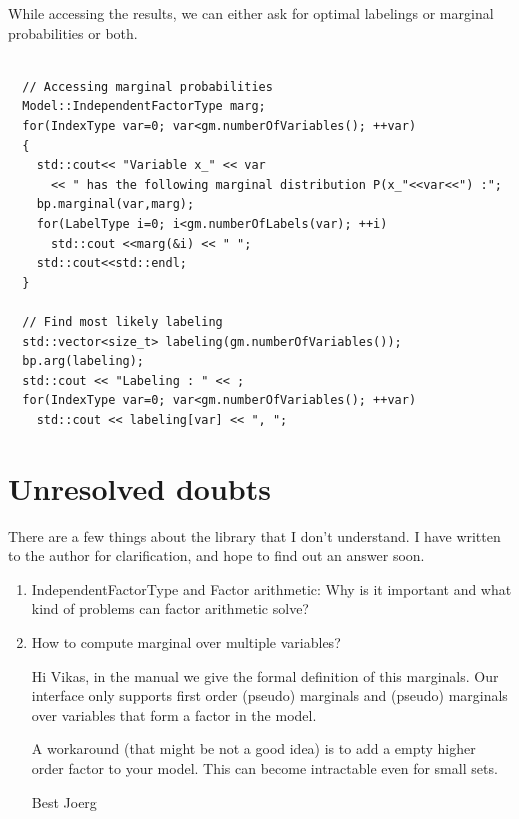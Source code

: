 \documentclass[12pt,oneside,letterpaper]{article}
\begin{document}
While accessing the results, we can either ask for optimal labelings or marginal probabilities or both.

\begin{lstlisting}

  // Accessing marginal probabilities
  Model::IndependentFactorType marg;
  for(IndexType var=0; var<gm.numberOfVariables(); ++var)
  {
    std::cout<< "Variable x_" << var 
      << " has the following marginal distribution P(x_"<<var<<") :";
    bp.marginal(var,marg);
    for(LabelType i=0; i<gm.numberOfLabels(var); ++i)
      std::cout <<marg(&i) << " ";
    std::cout<<std::endl;
  }   

  // Find most likely labeling
  std::vector<size_t> labeling(gm.numberOfVariables());
  bp.arg(labeling);
  std::cout << "Labeling : " << ;
  for(IndexType var=0; var<gm.numberOfVariables(); ++var)
    std::cout << labeling[var] << ", ";
\end{lstlisting}

\section{Unresolved doubts}
There are a few things about the library that I don't understand. I have
written to the author for clarification, and hope to find out an answer soon.

\begin{enumerate}
  \item IndependentFactorType and Factor arithmetic: Why is it important and what kind of problems can factor arithmetic solve?
  \item How to compute marginal over multiple variables?

    Hi Vikas,
    in the manual we give the formal definition of this marginals.
    Our interface only supports first order (pseudo) marginals and (pseudo) marginals over variables that form a factor in the model.

    A workaround (that might be not a good idea) is to add a empty higher order factor to your model. This can become intractable even for small sets.

    Best Joerg
\end{enumerate}



\end{document}
